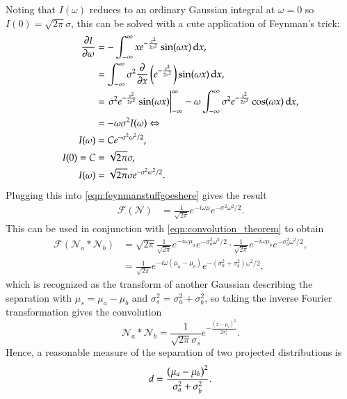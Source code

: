 Noting that $I(\omega)$ reduces to an ordinary Gaussian integral at $\omega = 0$ so $I(0) = \sqrt{2\pi}\sigma$, this can be solved with a cute application of Feynman's trick:
\begin{align*}
	\pardiff{I}{\omega} &= - \infint x e^{-\frac{x^2}{2\sigma^2}}\sin(\omega x) \ud x, \\
	&= \infint \sigma^2 \pardiff{}{x}\pp{e^{-\frac{x^2}{2\sigma^2}}}\sin(\omega x) \ud x, \\
	&= \left. \sigma^2 e^{-\frac{x^2}{2\sigma^2}} \sin(\omega x) \right|_{-\infty}^\infty - \omega\infint \sigma^2 e^{-\frac{x^2}{2\sigma^2}}\cos(\omega x) \ud x, \\
	&= -\omega\sigma^2 I(\omega) \Leftrightarrow \\
	I(\omega)&= C e^{-\sigma^2\omega^2/2}, \\
	I(0) = C &= \sqrt{2\pi}\sigma, \\
	I(\omega) &= \sqrt{2\pi}\sigma e^{-\sigma^2\omega^2/2}.
\end{align*}	
Plugging this into \eqref{eqn:feynmanstuffgoeshere} gives the result
\begin{align}
	\mathcal{F}(\mathcal{N}) &= \frac{1}{\sqrt{2\pi}}e^{-i\omega\mu}e^{-\sigma^2\omega^2/2}.
\end{align}
This can be used in conjunction with \eqref{eqn:convolution_theorem} to obtain
\begin{align}
	\mathcal{F}(\mathcal{N}_a*\mathcal{N}_b) &= \sqrt{2\pi} \frac{1}{\sqrt{2\pi}}e^{-i\omega\mu_a}e^{-\sigma_a^2\omega^2/2}\cdot \frac{1}{\sqrt{2\pi}} e^{-i\omega\mu_b}e^{-\sigma_b^2\omega^2/2}, \\
	&= \frac{1}{\sqrt{2\pi}}e^{-i\omega(\mu_a-\mu_b)}e^{-(\sigma_a^2+\sigma_b^2)\omega^2/2},
\end{align}
which is recognized as the transform of another Gaussian describing the separation with $\mu_s = \mu_a - \mu_b$ and ${\sigma_s^2 = \sigma_a^2 + \sigma_b^2}$, so taking the inverse Fourier transformation gives the convolution
\begin{equation}
	\mathcal{N}_a * \mathcal{N}_b = \frac{1}{\sqrt{2\pi}\sigma_s} e^{-\frac{(x-\mu_s)^2}{2\sigma_s^2}}.
\end{equation}
Hence, a reasonable measure of the separation of two projected distributions is
\begin{equation}
	d = \frac{\left( \mu_a - \mu_b \right)^2}{\sigma_a^2 + \sigma_b^2}. \label{eqn:broeksomskalmaximeres}
\end{equation}

